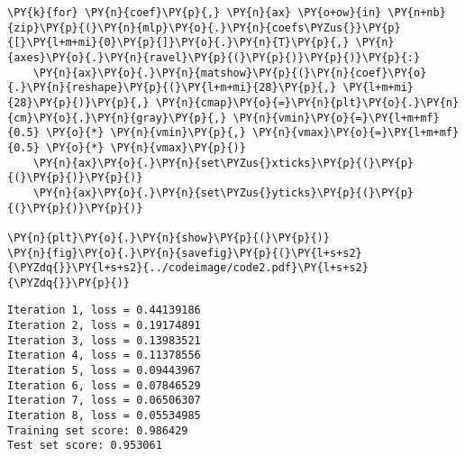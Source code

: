 \begin{Verbatim}[commandchars=\\\{\}]
\PY{k}{for} \PY{n}{coef}\PY{p}{,} \PY{n}{ax} \PY{o+ow}{in} \PY{n+nb}{zip}\PY{p}{(}\PY{n}{mlp}\PY{o}{.}\PY{n}{coefs\PYZus{}}\PY{p}{[}\PY{l+m+mi}{0}\PY{p}{]}\PY{o}{.}\PY{n}{T}\PY{p}{,} \PY{n}{axes}\PY{o}{.}\PY{n}{ravel}\PY{p}{(}\PY{p}{)}\PY{p}{)}\PY{p}{:}
    \PY{n}{ax}\PY{o}{.}\PY{n}{matshow}\PY{p}{(}\PY{n}{coef}\PY{o}{.}\PY{n}{reshape}\PY{p}{(}\PY{l+m+mi}{28}\PY{p}{,} \PY{l+m+mi}{28}\PY{p}{)}\PY{p}{,} \PY{n}{cmap}\PY{o}{=}\PY{n}{plt}\PY{o}{.}\PY{n}{cm}\PY{o}{.}\PY{n}{gray}\PY{p}{,} \PY{n}{vmin}\PY{o}{=}\PY{l+m+mf}{0.5} \PY{o}{*} \PY{n}{vmin}\PY{p}{,} \PY{n}{vmax}\PY{o}{=}\PY{l+m+mf}{0.5} \PY{o}{*} \PY{n}{vmax}\PY{p}{)}
    \PY{n}{ax}\PY{o}{.}\PY{n}{set\PYZus{}xticks}\PY{p}{(}\PY{p}{(}\PY{p}{)}\PY{p}{)}
    \PY{n}{ax}\PY{o}{.}\PY{n}{set\PYZus{}yticks}\PY{p}{(}\PY{p}{(}\PY{p}{)}\PY{p}{)}

\PY{n}{plt}\PY{o}{.}\PY{n}{show}\PY{p}{(}\PY{p}{)}
\PY{n}{fig}\PY{o}{.}\PY{n}{savefig}\PY{p}{(}\PY{l+s+s2}{\PYZdq{}}\PY{l+s+s2}{../codeimage/code2.pdf}\PY{l+s+s2}{\PYZdq{}}\PY{p}{)}
\end{Verbatim}

\begin{Verbatim}[commandchars=\\\{\}]
Iteration 1, loss = 0.44139186
Iteration 2, loss = 0.19174891
Iteration 3, loss = 0.13983521
Iteration 4, loss = 0.11378556
Iteration 5, loss = 0.09443967
Iteration 6, loss = 0.07846529
Iteration 7, loss = 0.06506307
Iteration 8, loss = 0.05534985
Training set score: 0.986429
Test set score: 0.953061
\end{Verbatim}